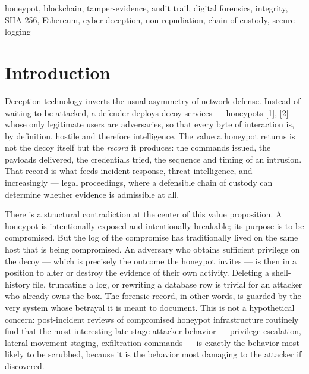 \documentclass[journal]{IEEEtran}
\begin{document}
\begin{IEEEkeywords}
honeypot, blockchain, tamper-evidence, audit trail, digital forensics, integrity, SHA-256, Ethereum, cyber-deception, non-repudiation, chain of custody, secure logging
\end{IEEEkeywords}

\section{Introduction}

Deception technology inverts the usual asymmetry of network defense. Instead of waiting to be attacked, a defender deploys decoy services --- honeypots [1], [2] --- whose only legitimate users are adversaries, so that every byte of interaction is, by definition, hostile and therefore intelligence. The value a honeypot returns is not the decoy itself but the \emph{record} it produces: the commands issued, the payloads delivered, the credentials tried, the sequence and timing of an intrusion. That record is what feeds incident response, threat intelligence, and --- increasingly --- legal proceedings, where a defensible chain of custody can determine whether evidence is admissible at all.

There is a structural contradiction at the center of this value proposition. A honeypot is intentionally exposed and intentionally breakable; its purpose is to be compromised. But the log of the compromise has traditionally lived on the same host that is being compromised. An adversary who obtains sufficient privilege on the decoy --- which is precisely the outcome the honeypot invites --- is then in a position to alter or destroy the evidence of their own activity. Deleting a shell-history file, truncating a log, or rewriting a database row is trivial for an attacker who already owns the box. The forensic record, in other words, is guarded by the very system whose betrayal it is meant to document. This is not a hypothetical concern: post-incident reviews of compromised honeypot infrastructure routinely find that the most interesting late-stage attacker behavior --- privilege escalation, lateral movement staging, exfiltration commands --- is exactly the behavior most likely to be scrubbed, because it is the behavior most damaging to the attacker if discovered.
\end{document}
